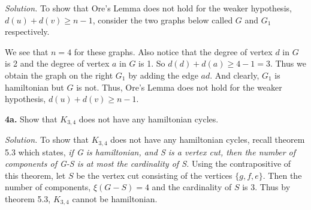 \documentclass{article}
\begin{document}
\vspace{3mm}
\textit{Solution.} To show that Ore's Lemma does not hold for the weaker hypothesis, \(d(u)+d(v) \geq n-1\), consider the two graphs below called \(G\) and \(G_1\) respectively.

\begin{center}
\hspace{20mm}
\end{center}

We see that \(n=4\) for these graphs. Also notice that the degree of vertex \(d\) in \(G\) is 2 and the degree of vertex \(a\) in \(G\) is 1. So \( d(d) + d(a) \geq 4-1 = 3 \). Thus we obtain the graph on the right \(G_1\) by adding the edge \(ad\). And clearly, \(G_1\) is hamiltonian but \(G\) is not. Thus, Ore's Lemma does not hold for the weaker hypothesis, \(d(u)+d(v) \geq n-1\).


\newpage
\textbf{4a.} Show that \(K_{3,4}\) does not have any hamiltonian cycles. 

\vspace{4mm} 

\textit{Solution.} To show that \(K_{3,4}\) does not have any hamiltonian cycles, recall theorem 5.3 which states, \textit{ if G is hamiltonian, and S is a vertex cut, then the number of components of G-S is at most the cardinality of S.} Using the contrapositive of this theorem, let \(S\) be the vertex cut consisting of the vertices \(\{g,f,e\}\). Then the number of components, \(\xi(G-S) = 4\) and the cardinality of \(S\) is 3. Thus by theorem 5.3, \(K_{3,4}\) cannot be hamiltonian. 


\begin{center}



\end{center}
\end{document}
